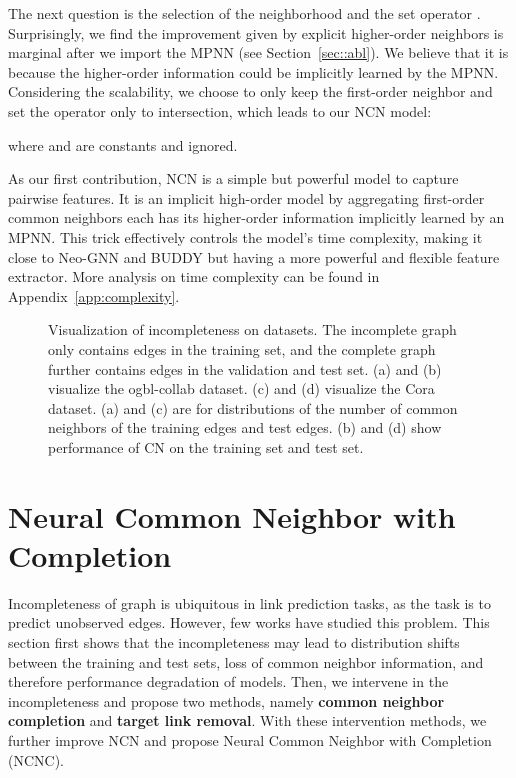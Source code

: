 \documentclass{article}
\theoremstyle{plain}
\theoremstyle{definition}
\theoremstyle{remark}
\begin{document}
The next question is the selection of the neighborhood and the set operator . Surprisingly, we find the improvement given by explicit higher-order neighbors is marginal after we import the MPNN (see Section~\ref{sec::abl}). We believe that it is because the higher-order information could be implicitly learned by the MPNN. Considering the scalability, we choose to only keep the first-order neighbor and set the operator only to intersection, which leads to our NCN model:

where  and  are constants and ignored. 

As our first contribution, NCN is a simple but powerful model to capture pairwise features. It is an implicit high-order model by aggregating first-order common neighbors each has its higher-order information implicitly learned by an MPNN. This trick effectively controls the model's time complexity, making it close to Neo-GNN and BUDDY but having a more powerful and flexible feature extractor. More analysis on time complexity can be found in Appendix~\ref{app:complexity}. 

\begin{figure}[h]
\centering
    \quad
    \vskip -0.1in
    \caption{
    Visualization of incompleteness on datasets. The incomplete graph only contains edges in the training set, and the complete graph further contains edges in the validation and test set.
    (a) and (b) visualize the ogbl-collab dataset. (c) and (d) visualize the Cora dataset. (a) and (c) are for distributions of the number of common neighbors of the training edges and test edges. (b) and (d) show performance of CN on the training set and test set. } 
    \label{fig:cndist}
    \vskip -0.2in
\end{figure}

\section{Neural Common Neighbor with Completion}\label{sec::intervene}
Incompleteness of graph is ubiquitous in link prediction tasks, as the task is to predict unobserved edges. However, few works have studied this problem. This section first shows that the incompleteness may lead to distribution shifts between the training and test sets, loss of common neighbor information, and therefore performance degradation of models. Then, we intervene in the incompleteness and propose two methods, namely \textbf{common neighbor completion} and \textbf{target link removal}. With these intervention methods, we further improve NCN and propose Neural Common Neighbor with Completion (NCNC).
\end{document}
